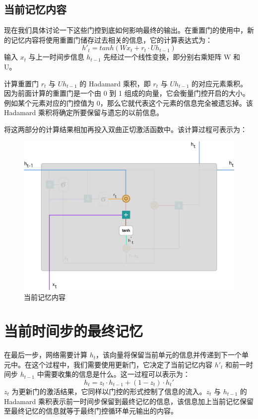 \documentclass{article}
\begin{document}
\subsection{当前记忆内容}
现在我们具体讨论一下这些门控到底如何影响最终的输出。在重置门的使用中，新的记忆内容将使用重置门储存过去相关的信息，它的计算表达式为：
\[h'_t = tanh(Wx_t+r_t\cdot Uh_{t-1})\]
输入 $x_t$ 与上一时间步信息 $h_{t-1}$ 先经过一个线性变换，即分别右乘矩阵 W 和 U。

计算重置门 $r_t$ 与 $Uh_{t-1}$ 的 Hadamard 乘积，即 $r_t$ 与 $Uh_{t-1}$ 的对应元素乘积。因为前面计算的重置门是一个由 0 到 1 组成的向量，它会衡量门控开启的大小。例如某个元素对应的门控值为 0，那么它就代表这个元素的信息完全被遗忘掉。该 Hadamard 乘积将确定所要保留与遗忘的以前信息。

将这两部分的计算结果相加再投入双曲正切激活函数中。该计算过程可表示为：
\begin{figure}[H]
	\centering
	\includegraphics[scale=0.2]{GRU6.png}
	\caption{当前记忆内容}
\end{figure}
\section{当前时间步的最终记忆}
在最后一步，网络需要计算 $h_t$，该向量将保留当前单元的信息并传递到下一个单元中。在这个过程中，我们需要使用更新门，它决定了当前记忆内容 $h'_t$ 和前一时间步 $h_{t-1}$ 中需要收集的信息是什么。这一过程可以表示为：
\[h_t = z_t\cdot h_{t-1}+(1-z_t)\cdot h_t'\]
$z_t$ 为更新门的激活结果，它同样以门控的形式控制了信息的流入。$z_t$ 与 $h_{t-1}$ 的 Hadamard 乘积表示前一时间步保留到最终记忆的信息，该信息加上当前记忆保留至最终记忆的信息就等于最终门控循环单元输出的内容。
\end{document}
